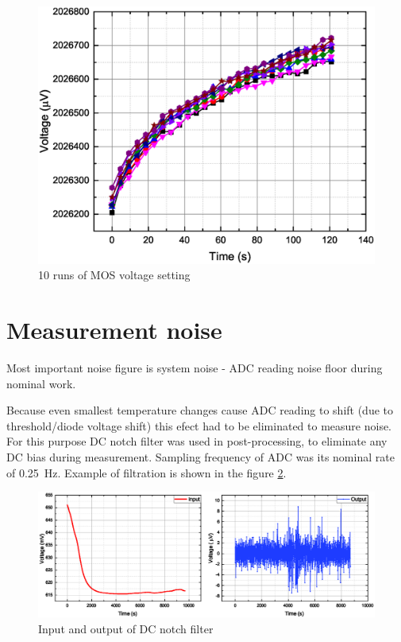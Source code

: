     \begin{figure}[H]
        \centering
        \includegraphics[width=0.8\paperwidth]{img/07/MOS_settling.eps}
        \caption{10 runs of MOS voltage setting}
        \label{MOS_settling}
    \end{figure}

\section{Measurement noise}
    Most important noise figure is system noise - ADC reading noise floor during nominal work.

    Because even smallest temperature changes cause ADC reading to shift (due to threshold/diode voltage shift) this efect had to be eliminated to measure noise. For this purpose DC notch filter was used in post-processing, to eliminate any DC bias during measurement. Sampling frequency of ADC was its nominal rate of \SI{0.25}{\hertz}. Example of filtration is shown in the figure \ref{notch_DC_example}.

    \begin{figure}[H]
        \centering
        \includegraphics[width=0.8\paperwidth]{img/07/filterBeforeAfter.eps}
        \caption{Input and output of DC notch filter}
        \label{notch_DC_example}
    \end{figure}


